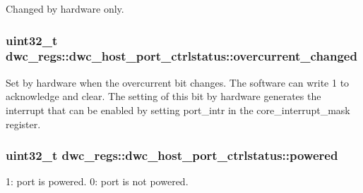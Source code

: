 Changed by hardware only. \hypertarget{uniondwc__regs_1_1dwc__host__port__ctrlstatus_a28c23c38988d620a8563e7e7d5d20107}{
\subsubsection[{overcurrent\-\_\-changed}]{\setlength{\rightskip}{0pt plus 5cm}uint32\-\_\-t dwc\-\_\-regs\-::dwc\-\_\-host\-\_\-port\-\_\-ctrlstatus\-::overcurrent\-\_\-changed}}\label{uniondwc__regs_1_1dwc__host__port__ctrlstatus_a28c23c38988d620a8563e7e7d5d20107}
Set by hardware when the overcurrent bit changes. The software can write 1 to acknowledge and clear. The setting of this bit by hardware generates the interrupt that can be enabled by setting port\-\_\-intr in the core\-\_\-interrupt\-\_\-mask register. \hypertarget{uniondwc__regs_1_1dwc__host__port__ctrlstatus_a01420294b4b933b9434613681a34cb6d}{
\subsubsection[{powered}]{\setlength{\rightskip}{0pt plus 5cm}uint32\-\_\-t dwc\-\_\-regs\-::dwc\-\_\-host\-\_\-port\-\_\-ctrlstatus\-::powered}}\label{uniondwc__regs_1_1dwc__host__port__ctrlstatus_a01420294b4b933b9434613681a34cb6d}
1\-: port is powered. 0\-: port is not powered.

